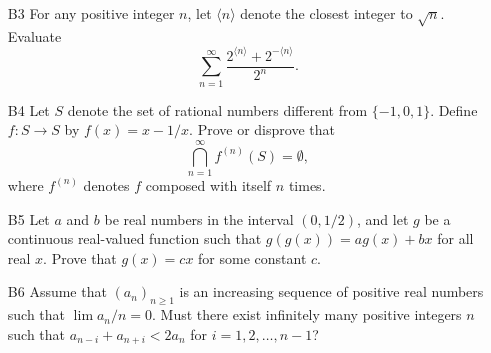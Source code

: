 \documentclass[amssymb,twocolumn,pra,10pt,aps]{revtex4-1}
\begin{document}
\begin{itemize}
\item[B3]
For any positive integer $n$, let $\langle n\rangle$ denote
the closest integer to $\sqrt{n}$.  Evaluate
\[\sum_{n=1}^\infty \frac{2^{\langle n\rangle}+2^{-\langle n\rangle}}
                         {2^n}.\]

\item[B4]
Let $S$ denote the set of rational numbers different from
$\{-1,0,1\}$.  Define $f:S\rightarrow S$ by $f(x)=x-1/x$.  Prove
or disprove that
\[\bigcap_{n=1}^\infty f^{(n)}(S) = \emptyset,\]
where $f^{(n)}$ denotes $f$ composed with itself $n$ times.

\item[B5]
Let $a$ and $b$ be real numbers in the interval $(0,1/2)$, and
let $g$ be a continuous real-valued function such that
$g(g(x))= ag(x)+bx$ for all real $x$.  Prove that
$g(x)=cx$ for some constant $c$.

\item[B6]
Assume that $(a_n)_{n\geq 1}$ is an increasing sequence of
positive real numbers such that
$\lim a_n/n=0$.  Must there exist infinitely many positive integers
$n$ such that $a_{n-i}+a_{n+i}<2a_n$ for $i=1,2,\ldots,n-1$?

\end{itemize}
\end{document}
